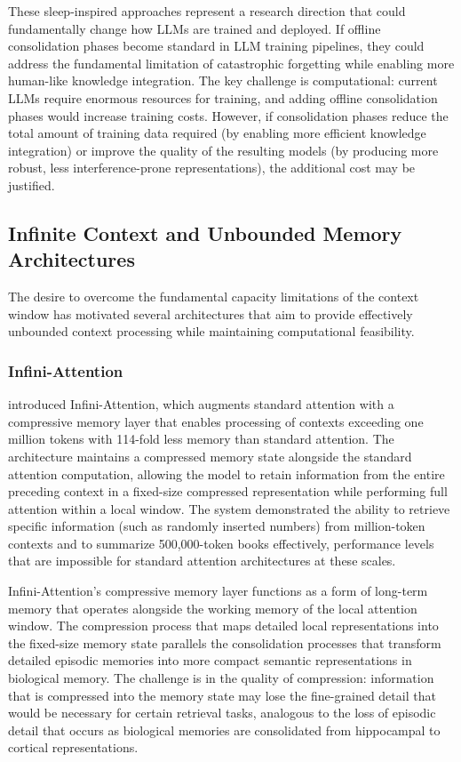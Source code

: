 These sleep-inspired approaches represent a research direction that could fundamentally change how LLMs are trained and deployed. If offline consolidation phases become standard in LLM training pipelines, they could address the fundamental limitation of catastrophic forgetting while enabling more human-like knowledge integration. The key challenge is computational: current LLMs require enormous resources for training, and adding offline consolidation phases would increase training costs. However, if consolidation phases reduce the total amount of training data required (by enabling more efficient knowledge integration) or improve the quality of the resulting models (by producing more robust, less interference-prone representations), the additional cost may be justified.

\subsection{Infinite Context and Unbounded Memory Architectures}

The desire to overcome the fundamental capacity limitations of the context window has motivated several architectures that aim to provide effectively unbounded context processing while maintaining computational feasibility.

\subsubsection{Infini-Attention}

\citet{munkhdalai2024leave} introduced Infini-Attention, which augments standard attention with a compressive memory layer that enables processing of contexts exceeding one million tokens with 114-fold less memory than standard attention. The architecture maintains a compressed memory state alongside the standard attention computation, allowing the model to retain information from the entire preceding context in a fixed-size compressed representation while performing full attention within a local window. The system demonstrated the ability to retrieve specific information (such as randomly inserted numbers) from million-token contexts and to summarize 500,000-token books effectively, performance levels that are impossible for standard attention architectures at these scales.

Infini-Attention's compressive memory layer functions as a form of long-term memory that operates alongside the working memory of the local attention window. The compression process that maps detailed local representations into the fixed-size memory state parallels the consolidation processes that transform detailed episodic memories into more compact semantic representations in biological memory. The challenge is in the quality of compression: information that is compressed into the memory state may lose the fine-grained detail that would be necessary for certain retrieval tasks, analogous to the loss of episodic detail that occurs as biological memories are consolidated from hippocampal to cortical representations.

